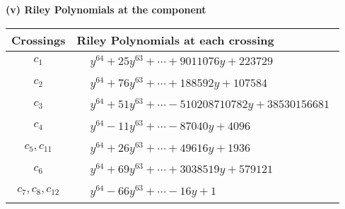 \documentclass[1p]{elsarticle_modified}
\theoremstyle{definition}
\begin{document}
\newpage\renewcommand{\arraystretch}{1}
\flushleft \textbf{(v) Riley Polynomials at the component}\newline \\
\begin{tabular}{m{50pt}|m{274pt}}
Crossings & \hspace{64pt}Riley Polynomials at each crossing \\
\hline $$\begin{aligned}c_{1}\end{aligned}$$&$\begin{aligned}
&y^{64}+25 y^{63}+\cdots+9011076 y+223729
\end{aligned}$\\
\hline $$\begin{aligned}c_{2}\end{aligned}$$&$\begin{aligned}
&y^{64}+76 y^{63}+\cdots+188592 y+107584
\end{aligned}$\\
\hline $$\begin{aligned}c_{3}\end{aligned}$$&$\begin{aligned}
&y^{64}+51 y^{63}+\cdots-510208710782 y+38530156681
\end{aligned}$\\
\hline $$\begin{aligned}c_{4}\end{aligned}$$&$\begin{aligned}
&y^{64}-11 y^{63}+\cdots-87040 y+4096
\end{aligned}$\\
\hline $$\begin{aligned}c_{5},c_{11}\end{aligned}$$&$\begin{aligned}
&y^{64}+26 y^{63}+\cdots+49616 y+1936
\end{aligned}$\\
\hline $$\begin{aligned}c_{6}\end{aligned}$$&$\begin{aligned}
&y^{64}+69 y^{63}+\cdots+3038519 y+579121
\end{aligned}$\\
\hline $$\begin{aligned}c_{7},c_{8},c_{12}\end{aligned}$$&$\begin{aligned}
&y^{64}-66 y^{63}+\cdots-16 y+1
\end{aligned}$\\

\end{tabular}
\end{document}
